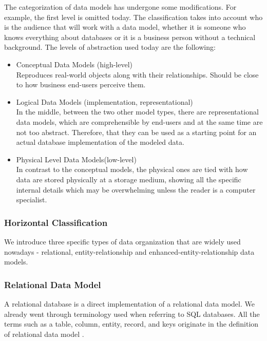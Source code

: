 The categorization of data models has undergone some modifications. For example, the first level is omitted today. The classification takes into account who is the audience that will work with a data model, whether it is someone who knows everything about databases or it is a business person without a technical background. The levels of abstraction used today \cite{SilberschatzKorthSudarshan10} are the following: 
\begin{itemize}
	\item Conceptual Data Models (high-level) \\
	Reproduces real-world objects along with their relationships. Should be close to how business end-users perceive them.
	
	\item Logical Data Models (implementation, representational) \\
	In the middle, between the two other model types, there are representational data models, which are comprehensible by end-users and at the same time are not too abstract. Therefore, that they can be used as a starting point for an actual database implementation of the modeled data.
	
	\item Physical Level Data Models(low-level) \\
	In contrast to the conceptual models, the physical ones are tied with how data are stored physically at a storage medium, showing all the specific internal details which may be overwhelming unless the reader is a computer specialist.
\end{itemize}

\subsubsection{Horizontal Classification}

We introduce three specific types of data organization that are widely used nowadays - relational, entity-relationship and enhanced-entity-relationship data models.

\subsubsection{Relational Data Model}

A relational database is a direct implementation of a relational data model. We already went through terminology used when referring to SQL databases. All the terms such as a table, column, entity, record, and keys originate in the definition of relational data model \cite{Codd69}.

